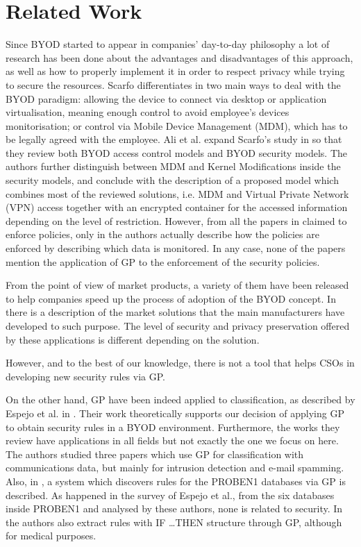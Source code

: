 \documentclass[a4paper,10pt,twocolumn,preprint,3p]{elsarticle}
\begin{document}
\section{Related Work}
\label{sec:SotA}


Since BYOD started to appear in companies' day-to-day philosophy a lot of research has been done about the advantages and disadvantages of this approach, as well as how to properly implement it in order to respect privacy while trying to secure the resources. Scarfo differentiates in \cite{scarfo2012new} two main ways to deal with the BYOD paradigm: allowing the device to connect via desktop or application virtualisation, meaning enough control to avoid employee's devices monitorisation; or control via Mobile Device Management (MDM), which has to be legally agreed with the employee. Ali et al. expand Scarfo's study in \cite{ali2015analysis} so that they review both BYOD access control models and BYOD security models. The authors further distinguish between MDM and Kernel Modifications inside the security models, and conclude with the description of a proposed model which combines most of the reviewed solutions, i.e. MDM and Virtual Private Network (VPN) access together with an encrypted container for the accessed information depending on the level of restriction. However, from all the papers in \cite{ali2015analysis} claimed to enforce policies, only in \cite{rhee2013high} the authors actually describe how the policies are enforced by describing which data is monitored. In any case, none of the papers mention the application of GP to the enforcement of the security policies.

From the point of view of market products, a variety of them have been released to help companies speed up the process of adoption of the BYOD concept. In \cite{de2015corporate} there is a description of the market solutions that the main manufacturers have developed to such purpose. The level of security and privacy preservation offered by these applications is different depending on the solution.

However, and to the best of our knowledge, there is not a tool that helps CSOs in developing new security rules via GP.

On the other hand, GP have been indeed applied to classification, as described by Espejo et al. in \cite{espejo2010survey}. Their work theoretically supports our decision of applying GP to obtain security rules in a BYOD environment. Furthermore, the works they review have applications in all fields but not exactly the one we focus on here. The authors studied three papers which use GP for classification with communications data, but mainly for intrusion detection and e-mail spamming. Also, in \cite{DeFalco2002257}, a system which discovers rules for the PROBEN1 databases via GP is described. As happened in the survey of Espejo et al., from the six databases inside PROBEN1 and analysed by these authors, none is related to security. %
In \cite{Tsakonas2004195} the authors also extract rules with \textsc{IF \ldots THEN} structure through GP, although for medical purposes.
\end{document}
